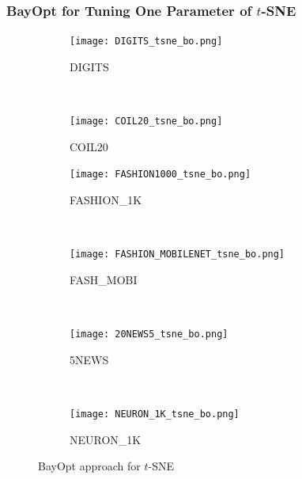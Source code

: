 \subsubsection{BayOpt for Tuning One Parameter of $t$-SNE}\label{sec:result:bo:tsne}

\begin{figure}%
    \begin{subfigure}[b]{.46\linewidth}
        \centering
        \texttt{[image: DIGITS\_tsne\_bo.png]}
        \caption{DIGITS}
    \end{subfigure}
    ~
    \begin{subfigure}[b]{.46\linewidth}
        \centering
        \texttt{[image: COIL20\_tsne\_bo.png]}
        \caption{COIL20}
    \end{subfigure}
    \vfill
    \begin{subfigure}[b]{.46\linewidth}
        \centering
        \texttt{[image: FASHION1000\_tsne\_bo.png]}
        \caption{{FASHION\_1K}}
    \end{subfigure}
    ~
    \begin{subfigure}[b]{.46\linewidth}
        \centering
        \texttt{[image: FASHION\_MOBILENET\_tsne\_bo.png]}
        \caption{{FASH\_MOBI}}
    \end{subfigure}
    ~
    \vfill
    \begin{subfigure}[b]{.46\linewidth}
        \centering
        \texttt{[image: 20NEWS5\_tsne\_bo.png]}
        \caption{5NEWS}
    \end{subfigure}
    ~
    \begin{subfigure}[b]{.46\linewidth}
        \centering
        \texttt{[image: NEURON\_1K\_tsne\_bo.png]}
        \caption{{NEURON\_1K}}
    \end{subfigure}
    \caption{BayOpt approach for  $t$-SNE}
    \label{fig:tsne:bo:all}
\end{figure}

